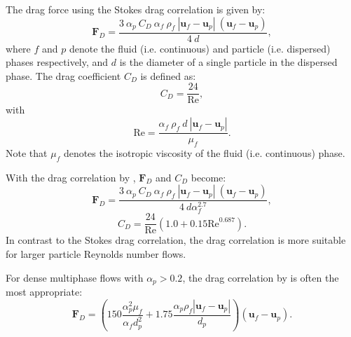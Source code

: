 The drag force using the Stokes drag correlation is given by:
\begin{equation}\label{eq:stokes_drag_force}
\mathbf{F}_D = \frac{3\ \alpha_p\ C_D\ \alpha_f\ \rho_f\ |\mathbf{u}_f-\mathbf{u}_p|\ (\mathbf{u}_f-\mathbf{u}_p)}{4\ d},
\end{equation}
where $f$ and $p$ denote the fluid (i.e. continuous) and particle (i.e. dispersed) phases respectively, and $d$ is the diameter of a single particle in the dispersed phase. The drag coefficient $C_D$ is defined as:
\begin{equation}\label{eq:stokes_drag_coefficient}
C_D = \frac{24}{\mathrm{Re}},
\end{equation}
with
\begin{equation}\label{eq:particle_reynolds_number}
\mathrm{Re} = \frac{\alpha_f\ \rho_f\ d\ |\mathbf{u}_f-\mathbf{u}_p|}{\mu_f}.
\end{equation}
Note that $\mu_f$ denotes the isotropic viscosity of the fluid (i.e. continuous) phase.

With the drag correlation by \cite{wen_yu_1966}, $\mathbf{F}_D$ and $C_D$ become:
\begin{equation}\label{eq:wen_yu_drag_force}
\mathbf{F}_D = \frac{3\ \alpha_p\ C_D\ \alpha_f\ \rho_f\ |\mathbf{u}_f-\mathbf{u}_p|\ (\mathbf{u}_f-\mathbf{u}_p)}{4\ d\alpha_f^{2.7}},
\end{equation}
\begin{equation}\label{eq:wen_yu_drag_coefficient}
C_D = \frac{24}{\mathrm{Re}}\left(1.0 + 0.15\mathrm{Re}^{0.687}\right).
\end{equation}
In contrast to the Stokes drag correlation, the \cite{wen_yu_1966} drag correlation is more suitable for larger particle Reynolds number flows.

For dense multiphase flows with $\alpha_p > 0.2$, the drag correlation by \cite{ergun1952} is often the most appropriate:
\begin{equation}\label{eq:ergun_drag_force}
\mathbf{F}_D = \left(150\frac{\alpha_p^2\mu_f}{\alpha_f d_p^2} + 1.75\frac{\alpha_p\rho_f|\mathbf{u}_f-\mathbf{u}_p|}{d_p}\right)\left(\mathbf{u}_f-\mathbf{u}_p\right).
\end{equation}

